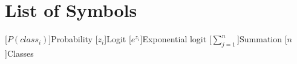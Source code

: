 \clearpage
\chapter*{List of Symbols} \label{}
\printglossary[title=List of Symbols,toctitle=List of Symbols]
\begin{acronym}
    [$P({class}_i)$]{Probability}
    [$z_i$]{Logit}
    [$e^{z_i}$]{Exponential logit}
    [$\sum_{j=1}^{n}$]{Summation}
    [$n$]{Classes}
\end{acronym}

	
